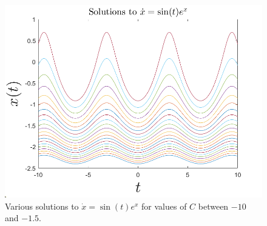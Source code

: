 \documentclass{article}
\begin{document}
\begin{itemize}
\begin{itemize}
        \begin{figure}[H]
            \includegraphics[scale = 0.5]{sin_t_expx_de.png}
            \centering
            \caption{Various solutions to $\dot{x} = \sin(t)e^x$ for values of $C$ between $-10$ and $-1.5$.}
        \end{figure}
    \end{itemize}
    
\end{itemize}
\end{document}
